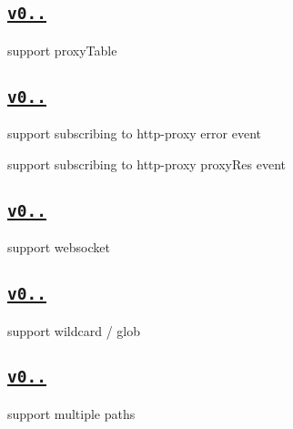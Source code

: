 \subsection*{\href{https://github.com/chimurai/http-proxy-middleware/releases/tag/v0.6.0}{\tt v0..}}


\begin{DoxyItemize}
\item support proxy\+Table
\end{DoxyItemize}

\subsection*{\href{https://github.com/chimurai/http-proxy-middleware/releases/tag/v0.5.0}{\tt v0..}}


\begin{DoxyItemize}
\item support subscribing to http-\/proxy {\ttfamily error} event
\item support subscribing to http-\/proxy {\ttfamily proxy\+Res} event
\end{DoxyItemize}

\subsection*{\href{https://github.com/chimurai/http-proxy-middleware/releases/tag/v0.4.0}{\tt v0..}}


\begin{DoxyItemize}
\item support websocket
\end{DoxyItemize}

\subsection*{\href{https://github.com/chimurai/http-proxy-middleware/releases/tag/v0.3.0}{\tt v0..}}


\begin{DoxyItemize}
\item support wildcard / glob
\end{DoxyItemize}

\subsection*{\href{https://github.com/chimurai/http-proxy-middleware/releases/tag/v0.2.0}{\tt v0..}}


\begin{DoxyItemize}
\item support multiple paths
\end{DoxyItemize}

